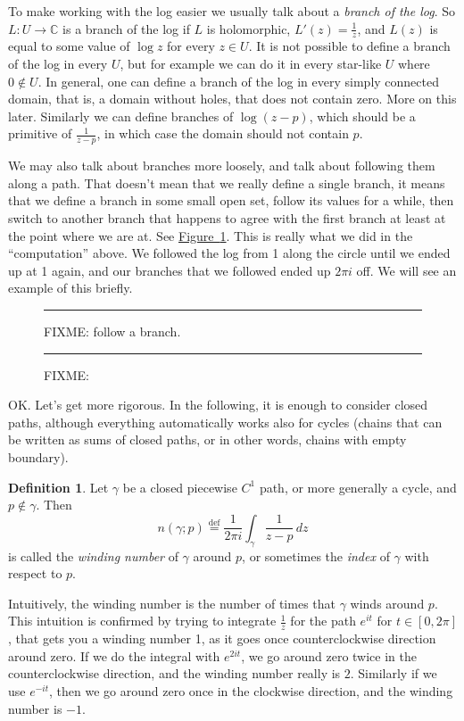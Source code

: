 \documentclass[12pt,openany]{book}
\newcommand{\C}{{\mathbb{C}}}
\newcommand{\myindex}[1]{#1\index{#1}}
\theoremstyle{plain}
\theoremstyle{remark}
\theoremstyle{definition}
\newtheorem{defn}[thm]{Definition}
\newenvironment{myfig}{%
\begin{figure}[h!t]
\noindent\rule{\textwidth}{0.4pt}\vspace{12pt}\par\centering}%
{\par\noindent\rule{\textwidth}{0.4pt}
\end{figure}}
\theoremstyle{exercise}
\theoremstyle{example}
\newcommand{\figureref}[1]{\hyperref[#1]{Figure~\ref*{#1}}}
\begin{document}
To make working with the log easier we usually talk about a
\emph{\myindex{branch of the log}}.  So $L \colon U \to \C$ is a branch
of the log if $L$ is holomorphic, $L'(z) = \frac{1}{z}$, and $L(z)$ is equal
to some value of $\log z$ for every $z \in U$.  It is not possible to define
a branch of the log in every $U$, but for example we can do it in every
star-like $U$ where $0 \notin U$.  In general, one can define a branch of
the log in every simply connected domain, that is, a domain without holes,
that does not contain zero.
More on this later.  Similarly we can define branches of $\log (z-p)$, which
should be a primitive of $\frac{1}{z-p}$, in which case the domain
should not contain $p$.

We may also talk about branches more loosely, and talk
about following them along a path.  That doesn't mean that we really define
a single branch, it means that we define a branch in some small open set,
follow its values for a while, then switch to another branch that 
happens to agree with the first branch at least at the point where we are
at.  See \figureref{fig:followabranch}.  This is really what we did in the
``computation'' above.  We followed the log from 1 along the circle until we
ended up at 1 again, and our branches that we followed ended up $2\pi i$
off.  We will see an example of this briefly.

\begin{myfig}
FIXME: follow a branch.
\caption{FIXME:\label{fig:followabranch}}
\end{myfig}

OK.  Let's get more rigorous.  In the following, it is enough
to consider closed paths, although everything automatically works
also for cycles (chains that can be written as sums of closed paths,
or in other words, chains with empty boundary).

\begin{defn}
Let $\gamma$ be a closed piecewise $C^1$ path, or more generally a cycle,
and $p \notin \gamma$.  Then
\begin{equation*}
n(\gamma;p)
\overset{\text{def}}{=}
\frac{1}{2\pi i} \int_\gamma \frac{1}{z-p} \, dz
\end{equation*}
is called the
\emph{\myindex{winding number}} of $\gamma$ around $p$, or
sometimes the 
\emph{\myindex{index}} of $\gamma$ with respect to $p$.
\end{defn}

Intuitively, the winding number is the number of times that $\gamma$ winds
around $p$.  This intuition is confirmed by trying to integrate
$\frac{1}{z}$ for the path $e^{it}$ for $t \in [0,2\pi]$, that gets you 
a winding number 1, as it goes once counterclockwise direction around zero.  If we do
the integral with $e^{2it}$, we go around zero twice in the
counterclockwise direction, and the winding number really is $2$.  Similarly
if we use $e^{-it}$, then we go around zero once in the
clockwise direction, and the winding number is $-1$.
\end{document}
